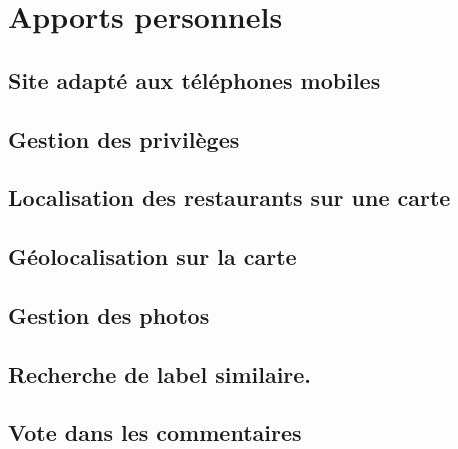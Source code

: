 \documentclass[a4paper,10pt]{article}
\begin{document}
\section{Apports personnels}
\subsection{Site adapté aux téléphones mobiles}

\subsection{Gestion des privilèges}

\subsection{Localisation des restaurants sur une carte}

\subsection{Géolocalisation sur la carte}

\subsection{Gestion des photos}

\subsection{Recherche de label similaire.}

\subsection{Vote dans les commentaires}
\end{document}
